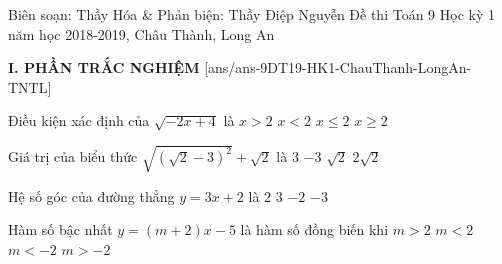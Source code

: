 
\begin{name}
{Biên soạn: Thầy Hóa \& Phản biện: Thầy Điệp Nguyễn}
{Đề thi Toán 9 Học kỳ 1 năm học 2018-2019, Châu Thành, Long An}
\end{name}
\noindent\textbf{I. PHẦN TRẮC NGHIỆM}
\setcounter{ex}{0}
[ans/ans-9DT19-HK1-ChauThanh-LongAn-TNTL]
\begin{ex}%
	Điều kiện xác định của $\sqrt{-2x+4}$ là
	\choice
	{$x>2 $}
	{$ x<2$}
	{\True $ x\leq 2$}
	{$ x\ge 2$}
\end{ex}

\begin{ex}%
	Giá trị của biểu thức $\sqrt{\left(\sqrt{2}-3\right)^2}+\sqrt{2}$ là
	\choice
	{\True $ 3$}
	{$ -3$}
	{$ \sqrt{2}$}
	{$ 2\sqrt{2}$}
\end{ex}

\begin{ex}%
	Hệ số góc của đường thẳng $y=3x+2$ là
	\choice
	{$ 2$}
	{\True $3 $}
	{$ -2$}
	{$ -3$}
\end{ex}

\begin{ex}%
	Hàm số bậc nhất $y=(m+2)x-5$ là hàm số đồng biến khi
	\choice
	{$m>2 $}
	{$ m<2$}
	{$ m<-2$}
	{\True $ m>-2$}
\end{ex}

